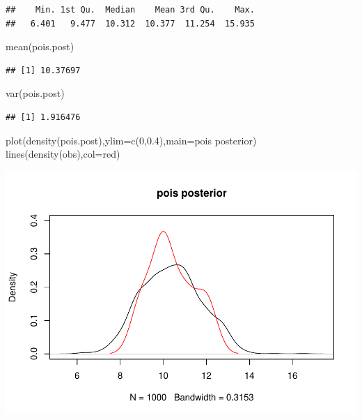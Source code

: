 \documentclass[
]{book}
\newenvironment{Shaded}{\begin{snugshade}}{\end{snugshade}}
\newcommand{\AttributeTok}[1]{\textcolor[rgb]{0.77,0.63,0.00}{#1}}
\newcommand{\DecValTok}[1]{\textcolor[rgb]{0.00,0.00,0.81}{#1}}
\newcommand{\FloatTok}[1]{\textcolor[rgb]{0.00,0.00,0.81}{#1}}
\newcommand{\FunctionTok}[1]{\textcolor[rgb]{0.00,0.00,0.00}{#1}}
\newcommand{\NormalTok}[1]{#1}
\newcommand{\StringTok}[1]{\textcolor[rgb]{0.31,0.60,0.02}{#1}}
\theoremstyle{definition}
\theoremstyle{definition}
\theoremstyle{definition}
\theoremstyle{definition}
\theoremstyle{remark}
\begin{document}
\begin{verbatim}
##    Min. 1st Qu.  Median    Mean 3rd Qu.    Max. 
##   6.401   9.477  10.312  10.377  11.254  15.935
\end{verbatim}

\begin{Shaded}
\begin{Highlighting}[]
  \FunctionTok{mean}\NormalTok{(pois.post)}
\end{Highlighting}
\end{Shaded}

\begin{verbatim}
## [1] 10.37697
\end{verbatim}

\begin{Shaded}
\begin{Highlighting}[]
  \FunctionTok{var}\NormalTok{(pois.post)}
\end{Highlighting}
\end{Shaded}

\begin{verbatim}
## [1] 1.916476
\end{verbatim}

\begin{Shaded}
\begin{Highlighting}[]
  \FunctionTok{plot}\NormalTok{(}\FunctionTok{density}\NormalTok{(pois.post),}\AttributeTok{ylim=}\FunctionTok{c}\NormalTok{(}\DecValTok{0}\NormalTok{,}\FloatTok{0.4}\NormalTok{),}\AttributeTok{main=}\StringTok{\textquotesingle{}pois posterior\textquotesingle{}}\NormalTok{)}
  \FunctionTok{lines}\NormalTok{(}\FunctionTok{density}\NormalTok{(obs),}\AttributeTok{col=}\StringTok{\textquotesingle{}red\textquotesingle{}}\NormalTok{)}
\end{Highlighting}
\end{Shaded}

\includegraphics{_main_files/figure-latex/unnamed-chunk-39-2.pdf}
\end{document}
